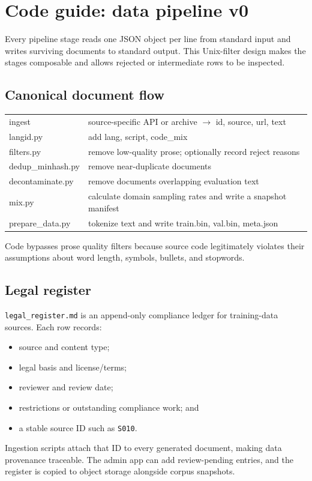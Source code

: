 \clearpage
\section{Code guide: data pipeline v0}

Every pipeline stage reads one JSON object per line from standard input and
writes surviving documents to standard output. This Unix-filter design makes
the stages composable and allows rejected or intermediate rows to be inspected.

\subsection{Canonical document flow}

\small\ttfamily
\begin{longtable}{@{}p{}p{}@{}}
  ingest & source-specific API or archive $\rightarrow$ id, source, url, text \\
  langid.py & add lang, script, code\_mix \\
  filters.py & remove low-quality prose; optionally record reject reasons \\
  dedup\_minhash.py & remove near-duplicate documents \\
  decontaminate.py & remove documents overlapping evaluation text \\
  mix.py & calculate domain sampling rates and write a snapshot manifest \\
  prepare\_data.py & tokenize text and write train.bin, val.bin, meta.json
\end{longtable}
\normalsize\rmfamily

Code bypasses prose quality filters because source code legitimately violates
their assumptions about word length, symbols, bullets, and stopwords.

\subsection{Legal register}

\texttt{legal\_register.md} is an append-only compliance ledger for
training-data sources. Each row records:
\begin{itemize}
    \setlength{\itemsep}{0pt}
  \item source and content type;
  \item legal basis and license/terms;
  \item reviewer and review date;
  \item restrictions or outstanding compliance work; and
  \item a stable source ID such as \texttt{S010}.
\end{itemize}
Ingestion scripts attach that ID to every generated document, making data
provenance traceable. The admin app can add review-pending entries, and the
register is copied to object storage alongside corpus snapshots.

